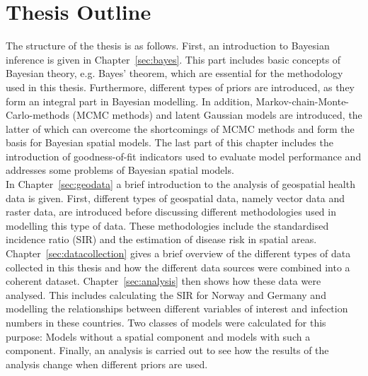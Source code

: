 \section{Thesis Outline}
The structure of the thesis is as follows. First, an introduction to Bayesian inference is given in Chapter~\ref{sec:bayes}. This part includes basic concepts of Bayesian theory, e.g. Bayes' theorem, which are essential for the methodology used in this thesis. Furthermore, different types of priors are introduced, as they form an integral part in Bayesian modelling. In addition, Markov-chain-Monte-Carlo-methods (MCMC methods) and latent Gaussian models are introduced, the latter of which can overcome the shortcomings of MCMC methods and form the basis for Bayesian spatial models. The last part of this chapter includes the introduction of goodness-of-fit indicators used to evaluate model performance and addresses some problems of Bayesian spatial models. \\
In Chapter~\ref{sec:geodata} a brief introduction to the analysis of geospatial health data is given. First, different types of geospatial data, namely vector data and raster data, are introduced before discussing different methodologies used in modelling this type of data. These methodologies include the standardised incidence ratio (SIR) and the estimation of disease risk in spatial areas. \\
Chapter~\ref{sec:datacollection} gives a brief overview of the different types of data collected in this thesis and how the different data sources were combined into a coherent dataset. Chapter~\ref{sec:analysis} then shows how these data were analysed. This includes calculating the SIR for Norway and Germany and modelling the relationships between different variables of interest and infection numbers in these countries. Two classes of models were calculated for this purpose: Models without a spatial component and models with such a component. Finally, an analysis is carried out to see how the results of the analysis change when different priors are used.